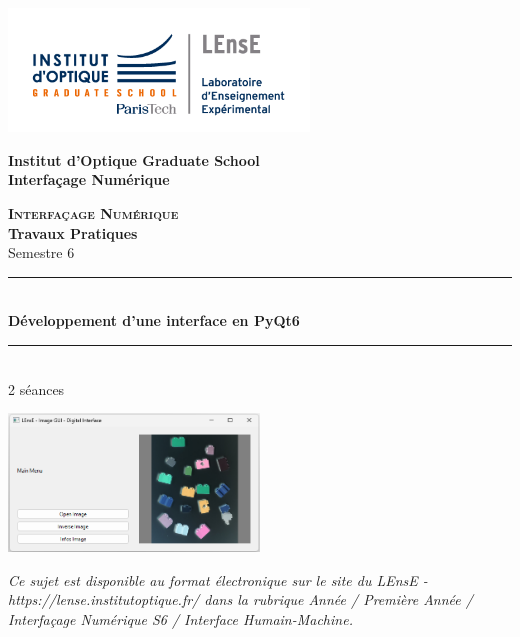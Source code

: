 \documentclass[a4paper,11pt,titlepage]{article} %
\begin{document}
\begin{titlepage}

\begin{center}
	\begin{minipage}{2.5cm}
	\begin{center}
		\includegraphics[width=8cm]{images/Logo-LEnsE.png}
	\end{center}
\end{minipage}\hfill
\begin{minipage}{10cm}
	\begin{center}
	\textbf{Institut d'Optique Graduate School }\\[0.1cm]
    \textbf{Interfaçage Numérique}


	\end{center}
\end{minipage}\hfill


\vspace{4cm}


{\huge \bfseries \textsc{Interfaçage Numérique}} \\[0.5cm]
{\large \bfseries Travaux Pratiques} \\[0.2cm]
Semestre 6

\vspace{2cm}
\rule{\linewidth}{0.3mm} \\[0.4cm]
{ \huge \bfseries\color{violet_iogs} Développement d'une interface en PyQt6 \\[0.4cm] }
\rule{\linewidth}{0.3mm} \\[1cm]

2 séances

\bigskip

\begin{center}
	\includegraphics[width=0.5\textwidth]{images/image_gui.png}
\end{center}

\vfill

\textit{Ce sujet est disponible au format électronique sur le site du LEnsE - https://lense.institutoptique.fr/ dans la rubrique Année / Première Année / Interfaçage Numérique S6 / Interface Humain-Machine.}


\end{center}
\end{titlepage}
\end{document}
